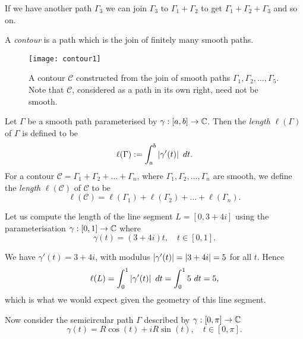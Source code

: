 If we have another path $\Gamma_3$ we can join $\Gamma_3$ to $\Gamma_1+\Gamma_2$ to get $\Gamma_1+\Gamma_2+\Gamma_3$ and so on.

\begin{definition}
A \emph{contour} is a path which is the join of finitely many smooth paths.
\end{definition}

\begin{figure}[h]
\centering
\texttt{[image: contour1]}
\caption{A contour $\mathcal{C}$ constructed from the join of smooth paths $\Gamma_1,\Gamma_2,\ldots,\Gamma_5$.  Note that $\mathcal{C}$, considered as a path in its own right, need not be smooth.}
\end{figure}


\begin{definition}
Let $\Gamma$ be a smooth path parameterised by $\gamma:[a,b] \to \mathbb{C}$.  Then the \emph{length} $\ell ( \Gamma)$ of $\Gamma$ is defined to be
\[
\ell ( \Gamma ) : = \int_a^b \left|  \gamma '(t)  \right| \ dt.
\]
For a contour $\mathcal{C} = \Gamma_1+\Gamma_2 + \ldots + \Gamma_n$, where $\Gamma_1,\Gamma_2, \ldots , \Gamma_n$ are smooth, we define the \emph{length} $\ell ( \mathcal{C} )$ of $\mathcal{C}$ to be
\[
\ell ( \mathcal{C} ) = \ell ( \Gamma_1 ) + \ell ( \Gamma_2 ) + \ldots + \ell ( \Gamma_n).
\]
\end{definition}
\begin{example}
\end{example}
Let us compute the length of the line segment $L=[0,3+4i]$ using the parameterisation $\gamma: [0,1] \to \mathbb{C}$ where
\[
\gamma (t) = (3+4i)t, \quad t \in [0,1].
\]




We have $\gamma'(t)=3+4i$, with modulus $\left| \gamma'(t) \right| = \left| 3+4i \right|=5$ for all $t$.  Hence
\[
\ell (L) = \int_0^1 \left| \gamma'(t) \right| \ dt = \int_0^1 5\ dt = 5,
\]
which is what we would expect given the geometry of this line segment.


Now consider the semicircular path $\Gamma$ described by $\gamma : [0,\pi] \to \mathbb{C}$
\[
\gamma (t) = R \cos (t) + i R \sin (t), \quad t \in [0,\pi].
\]

